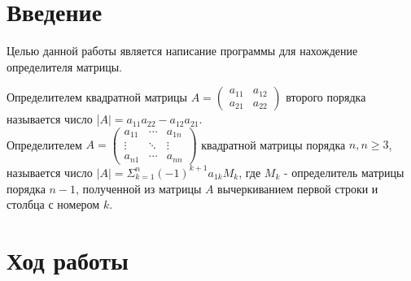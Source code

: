 \documentclass[12pt,a4paper]{scrartcl}
\begin{document}
\section{Введение}
\label{sec:intro}


Целью данной работы является написание программы для нахождение определителя матрицы.

Определителем квадратной матрицы $A=\left(\begin{array}{cc}a_{11}&a_{12}\\a_{21}&a_{22}\end{array}\right)$ второго порядка называется число |$A|=a_{11}a_{22}-a_{12}a_{21}$.\\

Определителем $A=\left(\begin{array}{ccc}a_{11}&\cdots&a_{1n}\\\vdots&\ddots&\vdots\\a_{n1}&\cdots&a_{nn}\end{array}\right)$ квадратной матрицы порядка $n,n\geq3$, называется число $|A|=\Sigma^{n}_{k=1}(-1)^{k+1}a_{1k}M_{k}$, где $M_{k}$ - определитель матрицы порядка $n-1$, полученной из матрицы $A$ вычеркиванием первой строки и столбца с номером $k$.

\section{Ход работы}
\label{sec:exp}
\end{document}
